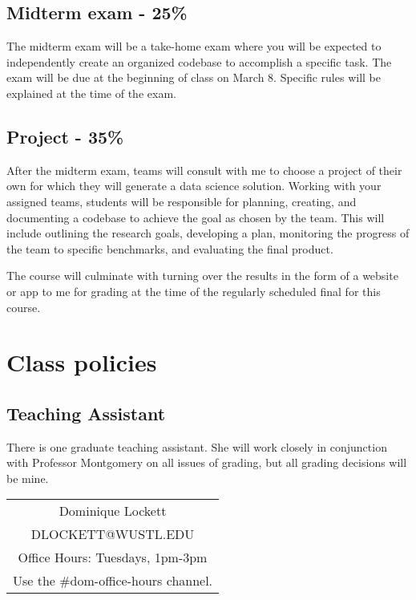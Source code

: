 \documentclass[11pt]{article}
\begin{document}
\subsection*{Midterm exam - 25\%}
The midterm exam will be a take-home exam where you will be expected
to independently create an organized codebase to accomplish a specific
task. The exam will be due at the beginning of class on March 8.  Specific rules will be
explained at the time of the exam.


\subsection*{Project - 35\%}

After the midterm exam, teams will consult with me to choose a
  project of their own for which they will generate a data science
  solution.  Working with your assigned teams, students will be
  responsible for planning, creating, and documenting a codebase to
  achieve the goal as chosen by the team.  This will include outlining
  the research goals, developing a plan, monitoring the progress of
  the team to specific benchmarks, and evaluating the final product.

The course will culminate with turning over the results in
the form of a website or app to me for grading at the time of the
regularly scheduled final for this course.


\section*{Class policies}

\subsection*{Teaching Assistant}

There is one graduate teaching assistant. She will work closely in
conjunction with Professor Montgomery on all issues of grading, but
all grading decisions will be mine.  
\vspace{.2cm}

\begin{center}
\begin{small}
\begin{tabular}{c}
Dominique Lockett \\
DLOCKETT@WUSTL.EDU\\
Office Hours: Tuesdays, 1pm-3pm\\
Use the \#dom-office-hours channel. 
\end{tabular}
\end{small}
\end{center}
\end{document}
